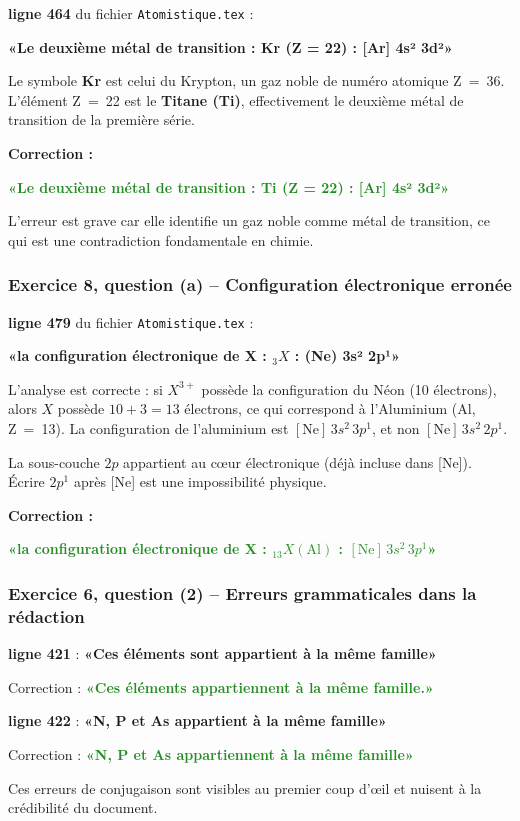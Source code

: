 \documentclass[12pt,a4paper]{article}
\newcommand{\fichier}[1]{\texttt{\small\color{Purple}#1}}
\newcommand{\ligne}[1]{\textbf{ligne #1}}
\newcommand{\correct}[1]{\textcolor{ForestGreen}{\textbf{#1}}}
\newcommand{\faux}[1]{\textcolor{BrickRed}{\textbf{#1}}}
\begin{document}
\begin{erreur}
\ligne{464} du fichier \fichier{Atomistique.tex} :

\faux{«Le deuxième métal de transition : Kr (Z = 22) : [Ar] 4s² 3d²»}

Le symbole \textbf{Kr} est celui du Krypton, un gaz noble de numéro atomique Z~=~36. L'élément Z~=~22 est le \textbf{Titane (Ti)}, effectivement le deuxième métal de transition de la première série.

\textbf{Correction :}

\correct{«Le deuxième métal de transition : Ti (Z = 22) : [Ar] 4s² 3d²»}

L'erreur est grave car elle identifie un gaz noble comme métal de transition, ce qui est une contradiction fondamentale en chimie.
\end{erreur}

\subsubsection{Exercice 8, question (a) -- Configuration électronique erronée}

\begin{erreur}
\ligne{479} du fichier \fichier{Atomistique.tex} :

\faux{«la configuration électronique de X : ${}_{3}X$ : (Ne) 3s² 2p¹»}

L'analyse est correcte : si $X^{3+}$ possède la configuration du Néon (10 électrons), alors $X$ possède $10 + 3 = 13$ électrons, ce qui correspond à l'Aluminium (Al, Z~=~13). La configuration de l'aluminium est $[\text{Ne}]\,3s^{2}\,3p^{1}$, et non $[\text{Ne}]\,3s^{2}\,2p^{1}$.

La sous-couche $2p$ appartient au cœur électronique (déjà incluse dans [Ne]). Écrire $2p^{1}$ après [Ne] est une impossibilité physique.

\textbf{Correction :}

\correct{«la configuration électronique de X : ${}_{13}X (\text{Al})$ : $[\text{Ne}]\,3s^{2}\,3p^{1}$»}
\end{erreur}

\subsubsection{Exercice 6, question (2) -- Erreurs grammaticales dans la rédaction}

\begin{avertissement}
\ligne{421} : \faux{«Ces éléments sont appartient à la même famille»}

Correction : \correct{«Ces éléments appartiennent à la même famille.»}

\ligne{422} : \faux{«N, P et As appartient à la même famille»}

Correction : \correct{«N, P et As appartiennent à la même famille»}

Ces erreurs de conjugaison sont visibles au premier coup d'œil et nuisent à la crédibilité du document.
\end{avertissement}
\end{document}
